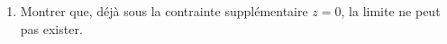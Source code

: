 {\begin{enumerate}
{\begin{enumerate}
\item Montrer que, d\'ej\`a sous la contrainte suppl\'ementaire $z=0$,
la limite ne peut pas exister.
\end{enumerate}}
\end{enumerate}
}
